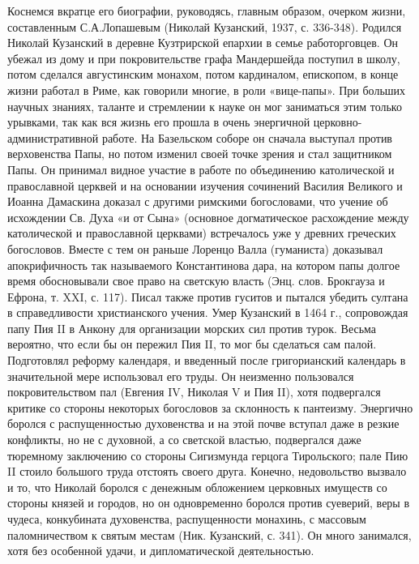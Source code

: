 Коснемся вкратце его биографии, руководясь, главным образом, очерком
жизни, составленным С.А.Лопашевым (Николай Кузанский, 1937, с.
336-348). Родился Николай Кузанский в деревне Кузтрирской епархии в
семье работорговцев. Он убежал из дому и при покровительстве графа
Мандершейда поступил в школу, потом сделался августинским монахом,
потом кардиналом, епископом, в конце жизни работал в Риме, как
говорили многие, в роли «вице-папы». При больших научных знаниях,
таланте и стремлении к науке он мог заниматься этим только урывками,
так как вся жизнь его прошла в очень энергичной
церковно-административной работе. На Базельском соборе он сначала
выступал против верховенства Папы, но потом изменил своей точке зрения
и стал защитником Папы. Он принимал видное участие в работе по
объединению католической и православной церквей и на основании
изучения сочинений Василия Великого и Иоанна Дамаскина доказал с
другими римскими богословами, что учение об исхождении Св. Духа «и от
Сына» (основное догматическое расхождение между католической и
православной церквами) встречалось уже у древних греческих богословов.
Вместе с тем он раньше Лоренцо Валла (гуманиста) доказывал
апокрифичность так называемого Константинова дара, на котором папы
долгое время обосновывали свое право на светскую власть (Энц. слов.
Брокгауза и Ефрона, т. XXI, с. 117). Писал также против гуситов и
пытался убедить султана в справедливости христианского учения. Умер
Кузанский в 1464 г., сопровождая папу Пия II в Анкону для организации
морских сил против турок. Весьма вероятно, что если бы он пережил Пия
II, то мог бы сделаться сам палой. Подготовлял реформу календаря, и
введенный после григорианский календарь в значительной мере
использовал его труды. Он неизменно пользовался покровительством пал
(Евгения IV, Николая V и Пия II), хотя подвергался критике со стороны
некоторых богословов за склонность к пантеизму. Энергично боролся с
распущенностью духовенства и на этой почве вступал даже в резкие
конфликты, но не с духовной, а со светской властью, подвергался даже
тюремному заключению со стороны Сигизмунда герцога Тирольского; пале
Пию II стоило большого труда отстоять своего друга. Конечно,
недовольство вызвало и то, что Николай боролся с денежным обложением
церковных имуществ со стороны князей и городов, но он одновременно
боролся против суеверий, веры в чудеса, конкубината духовенства,
распущенности монахинь, с массовым паломничеством к святым местам
(Ник. Кузанский, с. 341). Он много занимался, хотя без особенной
удачи, и дипломатической деятельностью.


